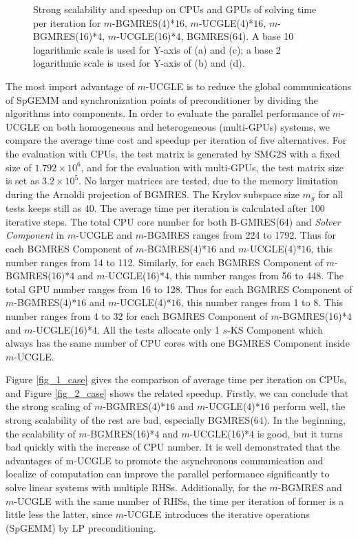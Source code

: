 \begin{figure}[htbp]
{		\label{fig_4_case}}
	\caption{Strong scalability and speedup on CPUs and GPUs of solving time per iteration for $m$-BGMRES(4)*$16$, $m$-UCGLE(4)*$16$, $m$-BGMRES(16)*$4$, $m$-UCGLE(16)*$4$, BGMRES(64). A base 10 logarithmic scale is used for Y-axis of (a) and (c); a base 2 logarithmic scale is used for Y-axis of (b) and (d).}
\end{figure}

The most import advantage of $m$-UCGLE is to reduce the global communications of SpGEMM and synchronization points of preconditioner by dividing the algorithms into components. In order to evaluate the parallel performance of $m$-UCGLE on both homogeneous and heterogeneous (multi-GPUs) systems, we compare the average time cost and speedup per iteration of five alternatives. For the evaluation with CPUs, the test matrix is generated by SMG2S with a fixed size of $1.792 \times 10^6$, and for the evaluation with multi-GPUs, the test matrix size is set as $3.2 \times 10^5$. No larger matrices are tested, due to the memory limitation during the Arnoldi projection of BGMRES. The Krylov subspace size $m_g$ for all tests keeps still as $40$. The average time per iteration is calculated after 100 iterative steps. The total CPU core number for both B-GMRES(64) and \textit{Solver Component} in $m$-UCGLE and $m$-BGMRES ranges from 224 to 1792. Thus for each BGMRES Component of $m$-BGMRES(4)*$16$ and $m$-UCGLE(4)*$16$, this number ranges from 14 to 112. Similarly, for each BGMRES Component of $m$-BGMRES(16)*$4$ and $m$-UCGLE(16)*$4$, this number ranges from 56 to 448. The total GPU number ranges from 16 to 128. Thus for each BGMRES Component of $m$-BGMRES(4)*$16$ and $m$-UCGLE(4)*$16$, this number ranges from 1 to 8. This number ranges from 4 to 32 for each BGMRES Component of $m$-BGMRES(16)*$4$ and $m$-UCGLE(16)*$4$. All the tests allocate only 1 $s$-KS Component which always has the same number of CPU cores with one BGMRES Component inside $m$-UCGLE.


Figure \ref{fig_1_case} gives the comparison of average time per iteration on CPUs, and Figure \ref{fig_2_case} shows the related speedup. Firstly, we can conclude that the strong scaling of $m$-BGMRES(4)*$16$ and $m$-UCGLE(4)*$16$ perform well, the strong scalability of the rest are bad, especially BGMRES(64). In the beginning, the scalability of $m$-BGMRES(16)*$4$ and $m$-UCGLE(16)*$4$ is good, but it turns bad quickly with the increase of CPU number. It is well demonstrated that the advantages of m-UCGLE to promote the asynchronous communication and localize of computation can improve the parallel performance significantly to solve linear systems with multiple RHSs. Additionally,  for the $m$-BGMRES and $m$-UCGLE with the same number of RHSs, the time per iteration of former is a little less the latter, since $m$-UCGLE introduces the iterative operations (SpGEMM) by LP preconditioning.

